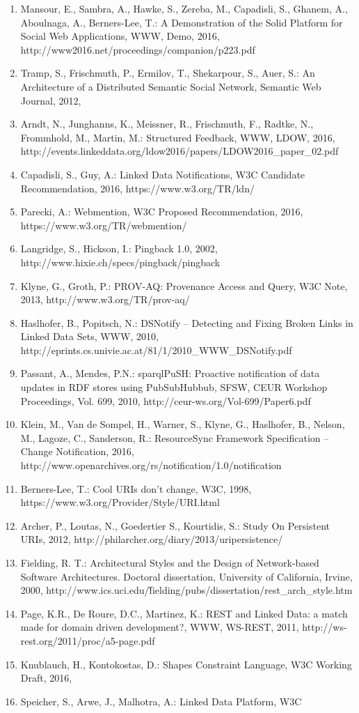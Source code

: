                         
                            \begin{enumerate}
  \item Mansour, E., Sambra, A., Hawke, S., Zereba, M., Capadisli, S., Ghanem, A., Aboulnaga, A., Berners-Lee, T.: A Demonstration of the Solid Platform for Social Web Applications, WWW, Demo, 2016, \empty http://www2016.net/proceedings/companion/p223.pdf\item Tramp, S., Frischmuth, P., Ermilov, T., Shekarpour, S., Auer, S.: An Architecture of a Distributed Semantic Social Network, Semantic Web Journal, 2012, \empty \item Arndt, N., Junghanns, K., Meissner, R., Frischmuth, F., Radtke, N., Frommhold, M., Martin, M.: Structured Feedback, WWW, LDOW, 2016, \empty http://events.linkeddata.org/ldow2016/papers/LDOW2016\_paper\_02.pdf\item Capadisli, S., Guy, A.: Linked Data Notifications, W3C Candidate Recommendation, 2016, \empty https://www.w3.org/TR/ldn/\item Parecki, A.: Webmention, W3C Proposed Recommendation, 2016, \empty https://www.w3.org/TR/webmention/\item Langridge, S., Hickson, I.: Pingback 1.0, 2002, \empty http://www.hixie.ch/specs/pingback/pingback\item Klyne, G., Groth, P.: PROV-AQ: Provenance Access and Query,  W3C Note, 2013, \empty http://www.w3.org/TR/prov-aq/\item Haslhofer, B., Popitsch, N.: DSNotify – Detecting and Fixing Broken Links in Linked Data Sets, WWW, 2010, \empty http://eprints.cs.univie.ac.at/81/1/2010\_WWW\_DSNotify.pdf\item Passant, A., Mendes, P.N.: sparqlPuSH: Proactive notification of data updates in RDF stores using PubSubHubbub, SFSW, CEUR Workshop Proceedings, Vol. 699, 2010, \empty http://ceur-ws.org/Vol-699/Paper6.pdf\item Klein, M., Van de Sompel, H., Warner, S., Klyne, G., Haslhofer, B., Nelson, M., Lagoze, C., Sanderson, R.: ResourceSync Framework Specification – Change Notification, 2016, \empty http://www.openarchives.org/rs/notification/1.0/notification\item Berners-Lee, T.: Cool URIs don't change, W3C, 1998, \empty https://www.w3.org/Provider/Style/URI.html\item Archer, P., Loutas, N., Goedertier S., Kourtidis, S.: Study On Persistent URIs, 2012, \empty http://philarcher.org/diary/2013/uripersistence/\item Fielding, R. T.: Architectural Styles and the Design of Network-based Software Architectures. Doctoral dissertation, University of California, Irvine, 2000, \empty http://www.ics.uci.edu/\~fielding/pubs/dissertation/rest\_arch\_style.htm\item Page, K.R., De Roure, D.C., Martinez, K.: REST and Linked Data: a match made for domain driven development?, WWW, WS-REST, 2011, \empty http://ws-rest.org/2011/proc/a5-page.pdf\item Knublauch, H., Kontokostas, D.: Shapes Constraint Language, W3C Working Draft, 2016, \empty \item Speicher, S., Arwe, J., Malhotra, A.: Linked Data Platform, W3C 
\end{enumerate}
